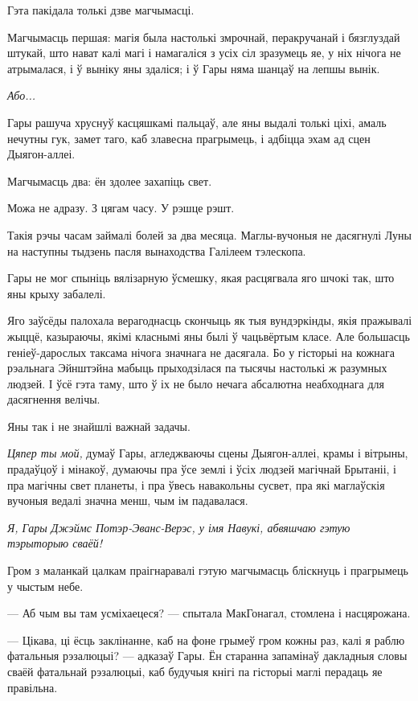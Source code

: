 Гэта пакідала толькі дзве магчымасці.

Магчымасць першая: магія была настолькі змрочнай, перакручанай і бязглуздай штукай,
што нават калі магі і намагаліся з усіх сіл зразумець яе, у ніх нічога не атрымалася,
і ў выніку яны здаліся; і ў Гары няма шанцаў на лепшы вынік.

\emph{Або...}

Гары рашуча хруснуў касцяшкамі пальцаў, але яны выдалі толькі ціхі, амаль нечутны гук,
замет таго, каб злавесна прагрымець, і адбіцца эхам ад сцен Дыягон-аллеі. 

Магчымасць два: ён здолее захапіць свет.

Можа не адразу. З цягам часу. У рэшце рэшт.

Такія рэчы часам займалі болей за два месяца. Маглы-вучоныя не дасягнулі Луны
на наступны тыдзень пасля вынаходства Галілеем тэлескопа.

Гары не мог спыніць вялізарную ўсмешку, якая расцягвала яго шчокі так, што 
яны крыху забалелі.

Яго заўсёды палохала верагоднасць скончыць як тыя вундэркінды, якія пражывалі
жыццё, казыраючы, якімі класнымі яны былі ў чацьвёртым класе. Але большасць 
геніеў-дарослых таксама нічога значнага не дасягала. Бо у гісторыі на кожнага 
рэальнага Эйнштэйна мабыць прыходзілася  
па тысячы настолькі ж разумных людзей.
І ўсё гэта таму, што ў іх не было нечага абсалютна неабходнага для дасягнення велічы.

Яны так і не знайшлі важнай задачы.

\emph{Цяпер ты мой,} думаў Гары, агледжваючы сцены Дыягон-аллеі, крамы і вітрыны, 
прадаўцоў і мінакоў, думаючы пра ўсе землі і ўсіх людзей магічнай Брытаніі,
і пра магічны свет планеты, і пра ўвесь навакольны сусвет, пра які маглаўскія
вучоныя ведалі значна менш, чым ім падавалася. 

\emph{Я, Гары Джэймс Потэр-Эванс-Верэс, у імя Навукі, абвяшчаю гэтую тэрыторыю сваёй!}

Гром з маланкай цалкам праігнаравалі гэтую магчымасць бліскнуць і прагрымець у 
чыстым небе.

--- Аб чым вы там усміхаецеся? --- спытала МакГонагал, стомлена і насцярожана.

--- Цікава, ці ёсць заклінанне, каб на фоне грымеў гром кожны раз, калі я раблю 
фатальныя рэзалюцыі? --- адказаў Гары. Ён старанна запамінаў дакладныя словы сваёй
фатальнай рэзалюцыі, каб будучыя кнігі па гісторыі маглі перадаць яе правільна.

